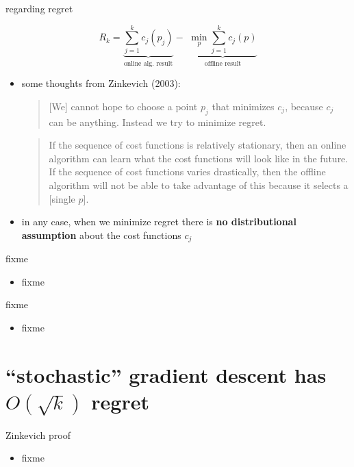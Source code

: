 \documentclass[xcolor={svgnames},
               hyperref={colorlinks,citecolor=DeepPink4,linkcolor=FireBrick,urlcolor=Maroon}]
               {beamer}
\begin{document}
\begin{frame}{regarding regret}

  $$R_k = \underbrace{\sum_{j=1}^k c_j(p_j)}_{\text{online alg.~result}} - \,\, \underbrace{\min_p \sum_{j=1}^k c_j(p)}_{\text{offline result}}$$

\begin{itemize}
\item some thoughts from Zinkevich (2003):

\medskip
\begin{quote}
[We] cannot hope to choose a point $p_j$ that minimizes $c_j$, because $c_j$ can be anything. Instead we try to minimize regret.
\end{quote}

\begin{quote}
If the sequence of cost functions is relatively stationary, then an online algorithm can learn what the cost functions will look like in the future.  If the sequence of cost functions varies drastically, then the offline algorithm will not be able to take advantage of this because it selects a [single $p$].
\end{quote}

\item in any case, when we minimize regret there is \textbf{no distributional assumption} about the cost functions $c_j$
\end{itemize}
\end{frame}


\begin{frame}{fixme}

\begin{itemize}
\item fixme
\end{itemize}
\end{frame}

\begin{frame}{fixme}

\begin{itemize}
\item fixme
\end{itemize}
\end{frame}


\section{``stochastic'' gradient descent has $O(\sqrt{k})$ regret}

\begin{frame}{Zinkevich proof}

\begin{itemize}
\item fixme
\end{itemize}
\end{frame}
\end{document}
